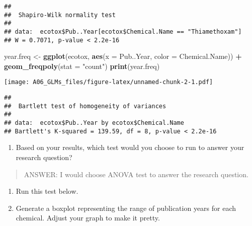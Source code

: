 \documentclass[]{article}
\newenvironment{Shaded}{\begin{snugshade}}{\end{snugshade}}
\newcommand{\KeywordTok}[1]{\textcolor[rgb]{0.13,0.29,0.53}{\textbf{#1}}}
\newcommand{\DataTypeTok}[1]{\textcolor[rgb]{0.13,0.29,0.53}{#1}}
\newcommand{\StringTok}[1]{\textcolor[rgb]{0.31,0.60,0.02}{#1}}
\newcommand{\CommentTok}[1]{\textcolor[rgb]{0.56,0.35,0.01}{\textit{#1}}}
\newcommand{\OperatorTok}[1]{\textcolor[rgb]{0.81,0.36,0.00}{\textbf{#1}}}
\newcommand{\NormalTok}[1]{#1}
\providecommand{\tightlist}{%
  \setlength{\itemsep}{0pt}\setlength{\parskip}{0pt}}
\begin{document}
\begin{verbatim}
## 
##  Shapiro-Wilk normality test
## 
## data:  ecotox$Pub..Year[ecotox$Chemical.Name == "Thiamethoxam"]
## W = 0.7071, p-value < 2.2e-16
\end{verbatim}

\begin{Shaded}
\begin{Highlighting}[]
\NormalTok{year.freq <-}\StringTok{ }\KeywordTok{ggplot}\NormalTok{(ecotox, }\KeywordTok{aes}\NormalTok{(}\DataTypeTok{x =}\NormalTok{ Pub..Year, }\DataTypeTok{color =}\NormalTok{ Chemical.Name)) }\OperatorTok{+}
\StringTok{         }\KeywordTok{geom_freqpoly}\NormalTok{(}\DataTypeTok{stat =} \StringTok{"count"}\NormalTok{)}
\KeywordTok{print}\NormalTok{(year.freq)}
\end{Highlighting}
\end{Shaded}

\texttt{[image: A06\_GLMs\_files/figure-latex/unnamed-chunk-2-1.pdf]}

\begin{Shaded}
\end{Shaded}

\begin{verbatim}
## 
##  Bartlett test of homogeneity of variances
## 
## data:  ecotox$Pub..Year by ecotox$Chemical.Name
## Bartlett's K-squared = 139.59, df = 8, p-value < 2.2e-16
\end{verbatim}

\begin{enumerate}
\def\labelenumi{\arabic{enumi}.}
\setcounter{enumi}{5}
\tightlist
\item
  Based on your results, which test would you choose to run to answer
  your research question?
\end{enumerate}

\begin{quote}
ANSWER: I would choose ANOVA test to answer the research question.
\end{quote}

\begin{enumerate}
\def\labelenumi{\arabic{enumi}.}
\setcounter{enumi}{6}
\item
  Run this test below.
\item
  Generate a boxplot representing the range of publication years for
  each chemical. Adjust your graph to make it pretty.
\end{enumerate}
\end{document}

